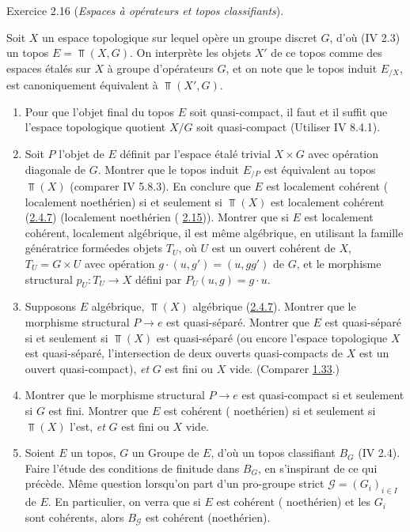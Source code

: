\documentclass[10pt]{../fichiers-configuration-latex/smfart}
\begin{document}
\begin{enonce*}[remark]{Exercice 2.16}
(\emph{Espaces à opérateurs et topos classifiants}).

Soit $X$ un espace topologique sur lequel opère un groupe discret
$G$, d'où (IV 2.3) un topos $E = \Top(X, G)$. On interprète les
objets $X'$ de ce topos comme des espaces étalés sur $X$ à groupe
d'opérateurs $G$, et on note que le topos induit $E_{/X}$, est
canoniquement équivalent à $\Top(X', G)$.
\begin{enumerate}
\renewcommand{\theenumi}{\alph{enumi}}
\renewcommand{\labelenumi}{\theenumi)}
\item Pour que l'objet final du topos $E$ soit quasi-compact, il faut
  et il suffit que l'espace topologique quotient $X/G$ soit
  quasi-compact (Utiliser IV 8.4.1).

\item Soit $P$ l'objet de $E$ définit par l'espace étalé trivial $X
  \times G$ avec opération diagonale de $G$. Montrer que le topos
  induit $E_{/P}$ est équivalent au topos $\Top(X)$ (comparer IV
  5.8.3). En conclure que $E$ est localement cohérent (\resp
  localement noethérien) si et seulement si $\Top(X)$ est localement
  cohérent (\cf \hyperref[VI.subsubsec2.4.7]{2.4.7}) (\resp localement noethérien (\cf
  \hyperref[VI.exem2.15]{2.15})). Montrer que si $E$ est localement cohérent, \ie localement
  algébrique, il est même algébrique, en utilisant la famille
  génératrice formée\pageoriginale des objets $T_U$, où $U$ est un
  ouvert cohérent   de $X$, $T_U = G \times U$ avec opération $g \cdot (u, g') =
  (u, gg')$ de $G$, et le morphisme structural $p_U : T_U \to X$ défini
  par $P_U(u, g) = g\cdot u$.

\item Supposons $E$ algébrique, \ie $\Top(X)$ algébrique
  (\hyperref[VI.subsubsec2.4.7]{2.4.7}). Montrer que le morphisme structural $P \to e$ est
  quasi-séparé. Montrer que $E$ est quasi-séparé si et seulement si
  $\Top(X)$ est quasi-séparé (ou encore l'espace topologique $X$ est
  quasi-séparé, \ie l'intersection de deux ouverts quasi-compacts de
  $X$ est un ouvert quasi-compact), \emph{et} $G$ est fini ou $X$
  vide. (Comparer \hyperref[VI.exem1.33]{1.33}.)

\item Montrer que le morphisme structural $P \to e$ est quasi-compact
  si et seulement si $G$ est fini. Montrer que $E$ est cohérent (\resp
  noethérien) si et seulement si $\Top(X)$ l'est, \emph{et} $G$ est
  fini ou $X$ vide.

\item Soient $E$ un topos, $G$ un Groupe de $E$, d'où un topos
  classifiant $B_G$ (IV 2.4). Faire l'étude des conditions de finitude
  dans $B_G$, en s'inspirant de ce qui précède. Même question
  lorsqu'on part d'un pro-groupe strict $𝒢 = (G_i)_{i \in I}$ de
  $E$. En particulier, on verra que si $E$ est cohérent (\resp
  noethérien) et les $G_i$ sont cohérents, alors $B_{𝒢}$ est cohérent
  (\resp noethérien).
\end{enumerate}
\end{enonce*}
\end{document}

